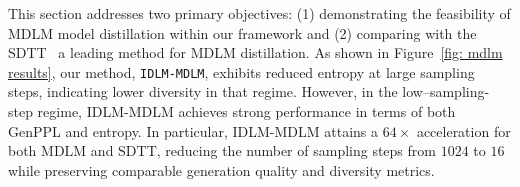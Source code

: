 
  This section addresses two primary objectives: (1) demonstrating the feasibility of MDLM model distillation within our framework and (2) comparing with the SDTT~\citep{deschenaux2024beyond} a leading method for MDLM distillation. As shown in Figure~\ref{fig: mdlm results}, our method, \texttt{IDLM-MDLM}, exhibits reduced entropy at large sampling steps, indicating lower diversity in that regime. However, in the low–sampling-step regime, IDLM-MDLM achieves strong performance in terms of both GenPPL and entropy. In particular, IDLM-MDLM attains a $64\times$ acceleration for both MDLM and SDTT, reducing the number of sampling steps from $1024$ to $16$ while preserving comparable generation quality and diversity metrics.

